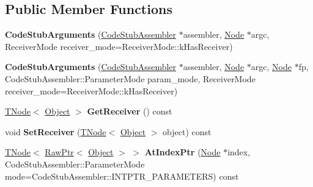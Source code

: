 \subsection*{Public Member Functions}
\begin{DoxyCompactItemize}
\item 
\mbox{\label{classv8_1_1internal_1_1CodeStubArguments_a3f592c38e96f42523756887afd07c825}} 
{\bfseries Code\+Stub\+Arguments} (\mbox{\hyperlink{classv8_1_1internal_1_1CodeStubAssembler}{Code\+Stub\+Assembler}} $\ast$assembler, \mbox{\hyperlink{classv8_1_1internal_1_1compiler_1_1Node}{Node}} $\ast$argc, Receiver\+Mode receiver\+\_\+mode=Receiver\+Mode\+::k\+Has\+Receiver)
\item 
\mbox{\label{classv8_1_1internal_1_1CodeStubArguments_a64c11d81a71cd72b49509d78cb3c3520}} 
{\bfseries Code\+Stub\+Arguments} (\mbox{\hyperlink{classv8_1_1internal_1_1CodeStubAssembler}{Code\+Stub\+Assembler}} $\ast$assembler, \mbox{\hyperlink{classv8_1_1internal_1_1compiler_1_1Node}{Node}} $\ast$argc, \mbox{\hyperlink{classv8_1_1internal_1_1compiler_1_1Node}{Node}} $\ast$fp, Code\+Stub\+Assembler\+::\+Parameter\+Mode param\+\_\+mode, Receiver\+Mode receiver\+\_\+mode=Receiver\+Mode\+::k\+Has\+Receiver)
\item 
\mbox{\label{classv8_1_1internal_1_1CodeStubArguments_a1a775fad42a64dfe7dc417a714b94c8c}} 
\mbox{\hyperlink{classv8_1_1internal_1_1compiler_1_1TNode}{T\+Node}}$<$ \mbox{\hyperlink{classv8_1_1internal_1_1Object}{Object}} $>$ {\bfseries Get\+Receiver} () const
\item 
\mbox{\label{classv8_1_1internal_1_1CodeStubArguments_ae4b6e7718cfad7ef1ef2ee0c6846a8d5}} 
void {\bfseries Set\+Receiver} (\mbox{\hyperlink{classv8_1_1internal_1_1compiler_1_1TNode}{T\+Node}}$<$ \mbox{\hyperlink{classv8_1_1internal_1_1Object}{Object}} $>$ object) const
\item 
\mbox{\label{classv8_1_1internal_1_1CodeStubArguments_a99b9348876095453c434b84af714adaa}} 
\mbox{\hyperlink{classv8_1_1internal_1_1compiler_1_1TNode}{T\+Node}}$<$ \mbox{\hyperlink{structv8_1_1internal_1_1RawPtr}{Raw\+Ptr}}$<$ \mbox{\hyperlink{classv8_1_1internal_1_1Object}{Object}} $>$ $>$ {\bfseries At\+Index\+Ptr} (\mbox{\hyperlink{classv8_1_1internal_1_1compiler_1_1Node}{Node}} $\ast$index, Code\+Stub\+Assembler\+::\+Parameter\+Mode mode=Code\+Stub\+Assembler\+::\+I\+N\+T\+P\+T\+R\+\_\+\+P\+A\+R\+A\+M\+E\+T\+E\+RS) const

\end{DoxyCompactItemize}
